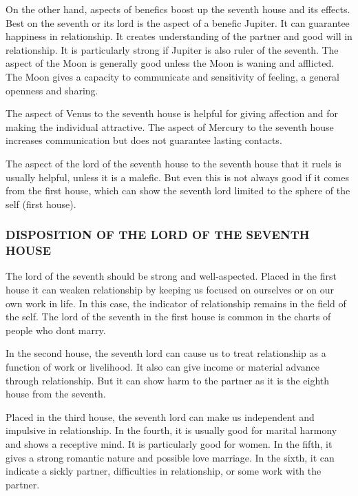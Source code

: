  

On the other hand, aspects of benefics boost up the seventh house and its effects. Best on the seventh or its lord is the aspect of a benefic Jupiter. It can guarantee happiness in relationship. It creates understanding of the partner and good will in relationship. It is particularly strong if Jupiter is also ruler of the seventh. The aspect of the Moon is generally good unless the Moon is waning and afflicted. The Moon gives a capacity to communicate and sensitivity of feeling, a general openness and sharing.

 

The aspect of Venus to the seventh house is helpful for giving affection and for making the individual attractive. The aspect of Mercury to the seventh house increases communication but does not guarantee lasting contacts.

 

The aspect of the lord of the seventh house to the seventh house that it ruels is usually helpful, unless it is a malefic. But even this is not always good if it comes from the first house, which can show the seventh lord limited to the sphere of the self (first house).

 

\subsubsection{DISPOSITION OF THE LORD OF THE SEVENTH HOUSE}

 

The lord of the seventh should be strong and well-aspected. Placed in the first house it can weaken relationship by keeping us focused on ourselves or on our own work in life. In this case, the indicator of relationship remains in the field of the self. The lord of the seventh in the first house is common in the charts of people who dont marry.

 

In the second house, the seventh lord can cause us to treat relationship as a function of work or livelihood. It also can give income or material advance through relationship. But it can show harm to the partner as it is the eighth house from the seventh.

 

Placed in the third house, the seventh lord can make us independent and impulsive in relationship. In the fourth, it is usually good for marital harmony and shows a receptive mind. It is particularly good for women. In the fifth, it gives a strong romantic nature and possible love marriage. In the sixth, it can indicate a sickly partner, difficulties in relationship, or some work with the partner.

